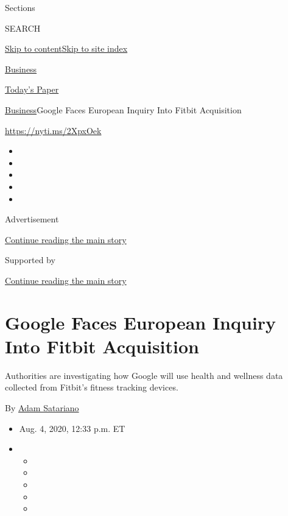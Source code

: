 Sections

SEARCH

\protect\hyperlink{site-content}{Skip to
content}\protect\hyperlink{site-index}{Skip to site index}

\href{https://www.nytimes.com/section/business}{Business}

\href{https://myaccount.nytimes.com/auth/login?response_type=cookie\&client_id=vi}{}

\href{https://www.nytimes.com/section/todayspaper}{Today's Paper}

\href{/section/business}{Business}\textbar{}Google Faces European
Inquiry Into Fitbit Acquisition

\url{https://nyti.ms/2XpxOek}

\begin{itemize}
\item
\item
\item
\item
\item
\end{itemize}

Advertisement

\protect\hyperlink{after-top}{Continue reading the main story}

Supported by

\protect\hyperlink{after-sponsor}{Continue reading the main story}

\hypertarget{google-faces-european-inquiry-into-fitbit-acquisition}{%
\section{Google Faces European Inquiry Into Fitbit
Acquisition}\label{google-faces-european-inquiry-into-fitbit-acquisition}}

Authorities are investigating how Google will use health and wellness
data collected from Fitbit's fitness tracking devices.

By \href{https://www.nytimes.com/by/adam-satariano}{Adam Satariano}

\begin{itemize}
\item
  Aug. 4, 2020, 12:33 p.m. ET
\item
  \begin{itemize}
  \item
  \item
  \item
  \item
  \item
  \end{itemize}
\end{itemize}

